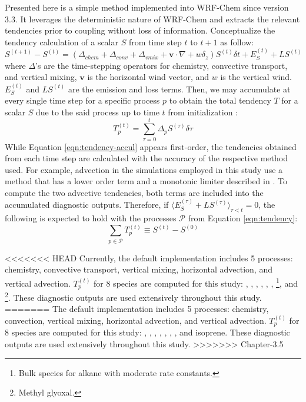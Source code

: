 	Presented here is a simple method implemented into WRF-Chem since version 3.3. It leverages the deterministic nature of WRF-Chem and extracts the relevant tendencies prior to coupling without loss of information. Conceptualize the tendency calculation of a scalar $S$ from time step $t$ to $t+1$ as follow:
	\begin{equation}\label{eqn:tendency}
		S^{(t+1)}-S^{(t)} = (\Delta_{chem}+\Delta_{conv}+\Delta_{vmix}+\mathbf{v}\cdot\nabla + w\delta_z)S^{(t)}\delta t + E_S^{(t)} + LS^{(t)}
	\end{equation}
	where $\Delta$'s are the time-stepping operators for chemistry, convective transport, and vertical mixing, $\mathbf{v}$ is the horizontal wind vector, and $w$ is the vertical wind. $E_S^{(t)}$ and $LS^{(t)}$ are the emission and loss terms. Then, we may accumulate at every single time step for a specific process $p$ to obtain the total tendency $T$ for a scalar $S$ due to the said process up to time $t$ from initialization :
	\begin{equation}\label{eqn:tendency-accul}
		T_{p}^{(t)} = \sum_{\tau=0}^t\Delta_{p} S^{(\tau)}\delta\tau
	\end{equation}
	While Equation \ref{eqn:tendency-accul} appears first-order, the tendencies obtained from each time step are calculated with the accuracy of the respective method used. For example, advection in the simulations employed in this study use a method that has a lower order term and a monotonic limiter described in \citet{Skamarock:2006wm}. To compute the two advective tendencies, both terms are included into the accumulated diagnostic outputs. Therefore,  if $\langle E_S^{(\tau)}+LS^{(\tau)}\rangle_{\tau<t}=0$, the following is expected to hold with the processes $\mathcal{P}$ from Equation \ref{eqn:tendency}:
	\begin{equation}\label{eqn:tendency-good}
		\sum_{p\in\mathcal{P}}T_{p}^{(t)} \equiv S^{(t)}-S^{(0)}
	\end{equation}
	
<<<<<<< HEAD
	Currently, the default implementation includes 5 processes: chemistry, convective transport, vertical mixing, horizontal advection, and vertical advection. $T_{p}^{(t)}$ for 8 species are computed for this study: , , , , , , \footnote{Bulk species for alkane with moderate  rate constants.}, and \footnote{Methyl glyoxal.}. These diagnostic outputs are used extensively throughout this study.
=======
	The default implementation includes 5 processes: chemistry, convection, vertical mixing, horizontal advection, and vertical advection. $T_{p}^{(t)}$ for 8 species are computed for this study: , , , , , , , and isoprene. These diagnostic outputs are used extensively throughout this study.
>>>>>>> Chapter-3.5
	
